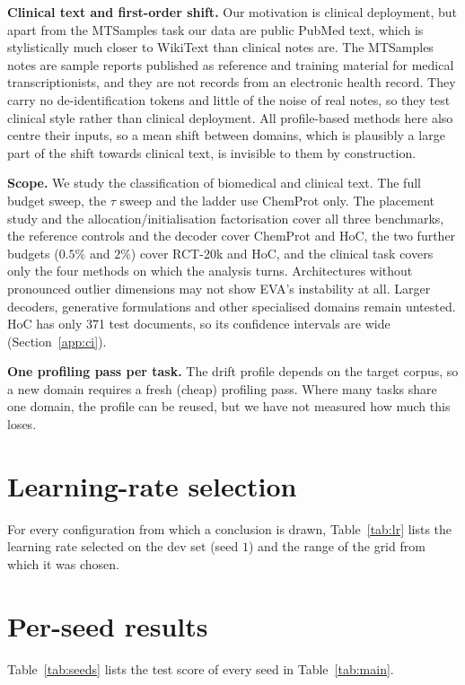 \documentclass[conference,onecolumn]{IEEEtran}
\begin{document}
\noindent\textbf{Clinical text and first-order shift.}
Our motivation is clinical deployment, but apart from the MTSamples task our
data are public PubMed text, which is stylistically much closer to WikiText than
clinical notes are. The MTSamples notes are sample reports published as
reference and training material for medical transcriptionists, and they are not
records from an electronic health record. They carry no de-identification tokens
and little of the noise of real notes, so they test clinical style rather than
clinical deployment. All profile-based methods here also centre their inputs,
so a mean shift between domains, which is plausibly a large part of the shift
towards clinical text, is invisible to them by construction.

\noindent\textbf{Scope.}
We study the classification of biomedical and clinical text. The full budget
sweep, the $\tau$ sweep and the ladder use ChemProt only. The placement study
and the allocation/initialisation factorisation cover all three benchmarks, the
reference controls and the decoder cover ChemProt and HoC, the two further
budgets ($0.5\%$ and $2\%$) cover RCT-20k and HoC, and the clinical task covers
only the four methods on which the analysis turns. Architectures without
pronounced outlier dimensions may not show EVA's instability at all. Larger
decoders, generative formulations and other specialised domains remain
untested. HoC has only 371 test documents, so its confidence intervals are wide
(Section~\ref{app:ci}).

\noindent\textbf{One profiling pass per task.}
The drift profile depends on the target corpus, so a new domain requires a fresh
(cheap) profiling pass. Where many tasks share one domain, the profile can be
reused, but we have not measured how much this loses.

\section{Learning-rate selection}
\label{app:lr}
For every configuration from which a conclusion is drawn, Table~\ref{tab:lr}
lists the learning rate selected on the dev set (seed $1$) and the range of the
grid from which it was chosen.


\section{Per-seed results}
\label{app:seeds}
Table~\ref{tab:seeds} lists the test score of every seed in
Table~\ref{tab:main}.
\end{document}
